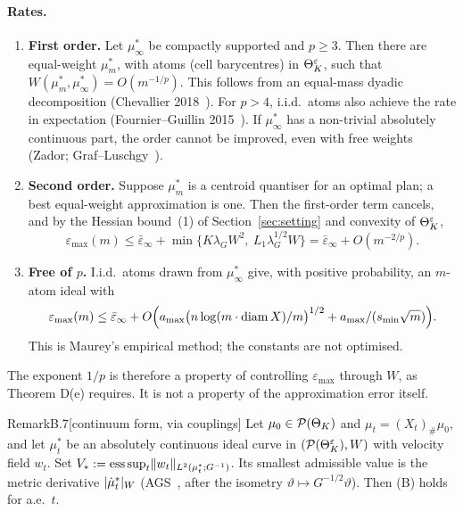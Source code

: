 \paragraph{Rates.}
\begin{enumerate}[label=(\alph*)]
\item \textbf{First order.} Let $\mu^*_\infty$ be compactly supported and $p\ge3$. Then there are equal-weight
  $\mu^*_m$, with atoms (cell barycentres) in $\Theta_K^{\varepsilon}$, such that $W(\mu^*_m,\mu^*_\infty)=O(m^{-1/p})$. This follows
  from an equal-mass dyadic decomposition (Chevallier 2018~\cite{S13}). For $p>4$, i.i.d.\ atoms also achieve the rate
  in expectation (Fournier--Guillin 2015~\cite{fg2015}). If $\mu^*_\infty$ has a non-trivial absolutely continuous
  part, the order cannot be improved, even with free weights (Zador; Graf--Luschgy~\cite[Thm.~6.2 with
  Lemma~3.4]{gl2000}).
\item \textbf{Second order.} Suppose $\mu^*_m$ is a centroid quantiser for an optimal plan; a best equal-weight
  approximation is one. Then the first-order term cancels, and by the Hessian bound~(1) of Section~\ref{sec:setting}
  and convexity of $\Theta_K^{\varepsilon}$,
  \[
    \varepsilon_{\max}(m)\le\bar\varepsilon_\infty+\min\bigl\{K\lambda_GW^2,\ L_1\lambda_G^{1/2}W\bigr\}
    =\bar\varepsilon_\infty+O(m^{-2/p}).
  \]
\item \textbf{Free of $p$.} I.i.d.\ atoms drawn from $\mu^*_\infty$ give, with positive probability, an $m$-atom
  ideal with
  \[
    \varepsilon_{\max}(m)\le\bar\varepsilon_\infty
    +O\Bigl(a_{\max}\bigl(n\log(m\cdot\operatorname{diam} X)/m\bigr)^{1/2}+a_{\max}/(s_{\min}\sqrt m)\Bigr).
  \]
  This is Maurey's empirical method; the constants are not optimised.
\end{enumerate}
The exponent $1/p$ is therefore a property of controlling $\varepsilon_{\max}$ through $W$, as Theorem D(e)
requires. It is not a property of the approximation error itself.

\begin{rmk}{Remark}{B.7}[continuum form, via couplings]
Let $\mu_0\in\mathcal{P}(\Theta_K)$ and $\mu_t=(X_t)_\#\mu_0$, and let $\mu^*_t$ be an absolutely continuous ideal curve in
$(\mathcal{P}(\Theta_K^{\varepsilon}),W)$ with velocity field $w_t$. Set $V_*:=\operatorname*{ess\,sup}_t\lVert w_t\rVert_{L^2(\mu^*_t;G^{-1})}$.
Its smallest admissible value is the metric derivative $\lvert \dot\mu^*_t\rvert_W$ (AGS~\cite[Thm.~8.3.1]{ags2008}, after the isometry $\vartheta\mapsto G^{-1/2}\vartheta$). Then
(B) holds for a.e.\ $t$.
\end{rmk}
\nopagebreak
{}

